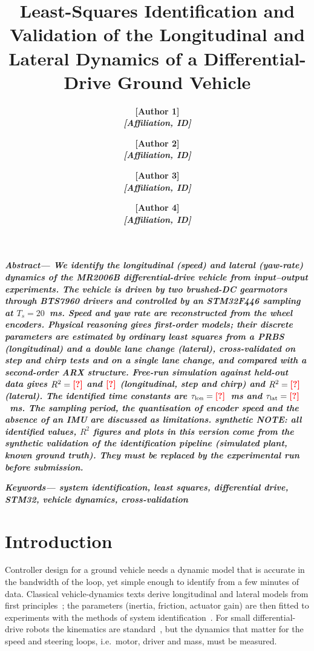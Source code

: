\documentclass[conference]{IEEEtran}\newcommand{\haveieee}{}%
\renewenvironment{abstract}{\noindent\small\bfseries\itshape Abstract\upshape---}{\par\vspace{0.6ex}\normalfont}
\newenvironment{IEEEkeywords}{\noindent\small\bfseries\itshape Keywords\upshape---\itshape}{\par\vspace{0.6ex}\normalfont}
\newcommand{\IEEEauthorblockN}[1]{\normalsize #1\\[0.3ex]}
\newcommand{\IEEEauthorblockA}[1]{\small\itshape #1}
\newcommand{\todo}[1]{{\color{red}\textbf{[#1]}}}
\providecommand{\DataSource}{\todo{?}}
\providecommand{\TsMs}{20}
\newcommand{\fallbackmacros}{\todo{?}}
\providecommand{\LonTauMs}{\fallbackmacros}\providecommand{\LonK}{\fallbackmacros}
\providecommand{\RtwoLonValSine}{\fallbackmacros}\providecommand{\RtwoLatTrain}{\fallbackmacros}
\providecommand{\RtwoLatVal}{\fallbackmacros}\providecommand{\RtwoLonArxTwoVal}{\fallbackmacros}
\def\synth{synthetic}
\newcommand{\synthnote}{\ifx\DataSource\synth
  {\color{red}\textbf{NOTE: all identified values, $R^2$ figures and plots in this version come from the \emph{synthetic} validation of the identification pipeline (simulated plant, known ground truth). They must be replaced by the experimental run before submission.}}\fi}
\begin{document}
\title{Least-Squares Identification and Validation of the Longitudinal and Lateral Dynamics of a Differential-Drive Ground Vehicle}

\author{%
\IEEEauthorblockN{\todo{Author 1}}\IEEEauthorblockA{\todo{Affiliation, ID}}
\and
\IEEEauthorblockN{\todo{Author 2}}\IEEEauthorblockA{\todo{Affiliation, ID}}
\and
\IEEEauthorblockN{\todo{Author 3}}\IEEEauthorblockA{\todo{Affiliation, ID}}
\and
\IEEEauthorblockN{\todo{Author 4}}\IEEEauthorblockA{\todo{Affiliation, ID}}
}
\maketitle

\begin{abstract}
We identify the longitudinal (speed) and lateral (yaw-rate) dynamics of the MR2006B differential-drive vehicle from input--output experiments. The vehicle is driven by two brushed-DC gearmotors through BTS7960 drivers and controlled by an STM32F446 sampling at $T_s=\TsMs$~ms. Speed and yaw rate are reconstructed from the wheel encoders. Physical reasoning gives first-order models; their discrete parameters are estimated by ordinary least squares from a PRBS (longitudinal) and a double lane change (lateral), cross-validated on step and chirp tests and on a single lane change, and compared with a second-order ARX structure. Free-run simulation against held-out data gives $R^2=\RtwoLonValStep$ and $\RtwoLonValSine$ (longitudinal, step and chirp) and $R^2=\RtwoLatVal$ (lateral). The identified time constants are $\tau_\mathrm{lon}=\LonTauMs$~ms and $\tau_\mathrm{lat}=\LatTauMs$~ms. The sampling period, the quantisation of encoder speed and the absence of an IMU are discussed as limitations. \synthnote
\end{abstract}

\begin{IEEEkeywords}
system identification, least squares, differential drive, STM32, vehicle dynamics, cross-validation
\end{IEEEkeywords}

\section{Introduction}
Controller design for a ground vehicle needs a dynamic model that is accurate in the bandwidth of the loop, yet simple enough to identify from a few minutes of data. Classical vehicle-dynamics texts derive longitudinal and lateral models from first principles~\cite{rajamani2011,gillespie1992}; the parameters (inertia, friction, actuator gain) are then fitted to experiments with the methods of system identification~\cite{ljung1999}. For small differential-drive robots the kinematics are standard~\cite{siegwart2011}, but the dynamics that matter for the speed and steering loops, i.e.\ motor, driver and mass, must be measured.
\end{document}

